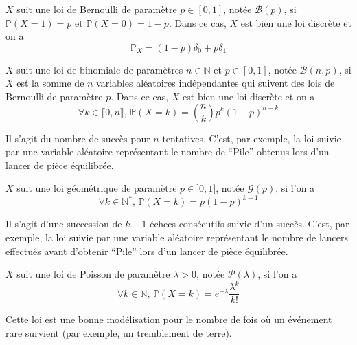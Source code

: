   \begin{example}
    $X$ suit une loi de Bernoulli de paramètre $p \in [0,1]$, notée $\mathcal{B}(p)$, si $\mathbb{P}(X=1) = p$ et $\mathbb{P}(X=0)=1-p$. Dans ce cas, $X$ est bien une loi discrète et on a
    \[ \mathbb{P}_X = (1-p) \delta_0 + p \delta_1 \]
  \end{example}

  \begin{example}
    $X$ suit une loi de binomiale de paramètres $n \in \mathbb{N}$ et $p \in [0,1]$, notée $\mathcal{B}(n, p)$, si $X$ est la somme de $n$ variables aléatoires indépendantes qui suivent des lois de Bernoulli de paramètre $p$. Dans ce cas, $X$ est bien une loi discrète et on a
    \[ \forall k \in \llbracket 0,n \rrbracket, \, \mathbb{P}(X = k) = \binom{n}{k} p^k (1-p)^{n-k} \]
  \end{example}

  \begin{remark}
    Il s'agit du nombre de succès pour $n$ tentatives.
    \newpar
    C'est, par exemple, la loi suivie par une variable aléatoire représentant le nombre de ``Pile'' obtenus lors d'un lancer de pièce équilibrée.
  \end{remark}

  \begin{example}
    $X$ suit une loi géométrique de paramètre $p \in ]0,1]$, notée $\mathcal{G}(p)$, si l'on a
    \[ \forall k \in \mathbb{N}^{*}, \, \mathbb{P}(X = k) = p(1-p)^{k-1} \]
  \end{example}

  \begin{remark}
    Il s'agit d'une succession de $k-1$ échecs consécutifs suivie d'un succès.
    \newpar
    C'est, par exemple, la loi suivie par une variable aléatoire représentant le nombre de lancers effectués avant d'obtenir ``Pile'' lors d'un lancer de pièce équilibrée.
  \end{remark}

  \begin{example}
    $X$ suit une loi de Poisson de paramètre $\lambda > 0$, notée $\mathcal{P}(\lambda)$, si l'on a
    \[ \forall k \in \mathbb{N}, \, \mathbb{P}(X = k) = e^{-\lambda} \frac{\lambda^k}{k!} \]
  \end{example}


  \begin{remark}
    Cette loi est une bonne modélisation pour le nombre de fois où un événement rare survient (par exemple, un tremblement de terre).
  \end{remark}

